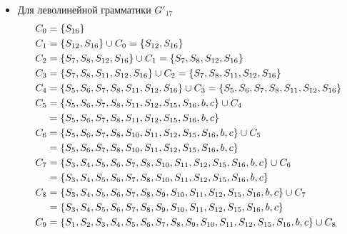 \begin{itemize}
	\item Для леволинейной грамматики \(G'_{17}\)
	      \begin{align*}
		      C_{0}  & = \cbr{S_{16}}                                                                                                            \\
		      C_{1}  & = \cbr{S_{12}, S_{16}} \cup C_{0} = \cbr{S_{12}, S_{16}}                                                                  \\
		      C_{2}  & = \cbr{S_7, S_8, S_{12}, S_{16}} \cup C_{1} = \cbr{S_7, S_8, S_{12}, S_{16}}                                              \\
		      C_{3}  & = \cbr{S_7, S_8, S_{11}, S_{12}, S_{16}} \cup C_{2} = \cbr{S_7, S_8, S_{11}, S_{12}, S_{16}}                              \\
		      C_{4}  & = \cbr{S_5, S_6, S_7, S_8, S_{11}, S_{12}, S_{16}} \cup C_{3} = \cbr{S_5, S_6, S_7, S_8, S_{11}, S_{12}, S_{16}}          \\
		      C_{5}  & = \cbr{S_5, S_6, S_7, S_8, S_{11}, S_{12}, S_{15}, S_{16}, b, c} \cup C_{4}                                               \\
		             & = \cbr{S_5, S_6, S_7, S_8, S_{11}, S_{12}, S_{15}, S_{16}, b, c}                                                          \\
		      C_{6}  & = \cbr{S_5, S_6, S_7, S_8, S_{10}, S_{11}, S_{12}, S_{15}, S_{16}, b, c} \cup C_{5}                                       \\
		             & = \cbr{S_5, S_6, S_7, S_8, S_{10}, S_{11}, S_{12}, S_{15}, S_{16}, b, c}                                                  \\
		      C_{7}  & = \cbr{S_3, S_4, S_5, S_6, S_7, S_8, S_{10}, S_{11}, S_{12}, S_{15}, S_{16}, b, c} \cup C_{6}                             \\
		             & = \cbr{S_3, S_4, S_5, S_6, S_7, S_8, S_{10}, S_{11}, S_{12}, S_{15}, S_{16}, b, c}                                        \\
		      C_{8}  & = \cbr{S_3, S_4, S_5, S_6, S_7, S_8, S_9, S_{10}, S_{11}, S_{12}, S_{15}, S_{16}, b, c} \cup C_{7}                        \\
		             & = \cbr{S_3, S_4, S_5, S_6, S_7, S_8, S_9, S_{10}, S_{11}, S_{12}, S_{15}, S_{16}, b, c}                                   \\
		      C_{9}  & = \cbr{S_1, S_2, S_3, S_4, S_5, S_6, S_7, S_8, S_9, S_{10}, S_{11}, S_{12}, S_{15}, S_{16}, b, c} \cup C_{8}              \\

\end{align*}
\end{itemize}
